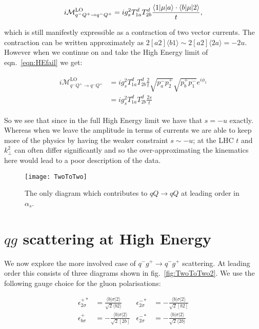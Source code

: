 		\begin{equation}
			i\mathcal{M}_{q^-Q^+\rightarrow q^-Q^+}^{\text{LO}} = ig_s^2T^d_{1a}T^d_{2b}
			\frac{\langle 1 | \mu | a \rangle\cdot\langle b | \mu | 2 \rangle}{t},
			\label{eqn:HEfail}
		\end{equation}

		which is still manifestly expressible as a contraction of two vector currents.  The contraction
		can be written approximately as $2[a2]\langle b1\rangle\sim2[a2]\langle2a\rangle=-2u$.
		However when we continue on and take the High Energy limit of eqn.~\eqref{eqn:HEfail} we get:

		\begin{align}
		\begin{split}
			i\mathcal{M}_{q^-Q^+\rightarrow q^-Q^+}^{\text{LO}} &=
			ig_s^2T^d_{1a}T^d_{2b}\frac{2}{t}\sqrt{p_a^-p_2^+}\sqrt{p_b^+p_1^-}e^{i\phi_1}\\
			&=ig_s^2T^d_{1a}T^d_{2b}\frac{2s}{t}
		\end{split}
		\end{align}

		So we see that since in the full High Energy limit we have that $s=-u$
		exactly.  Whereas when we leave the amplitude in terms of currents we are able to keep
		more of the physics by having the weaker constraint $s\sim-u$; at the LHC $t$ and $k_\perp^2$
		can often differ significantly and so the over-approximating the kinematics here would
		lead to a poor description of the data.

		\begin{figure}
			\begin{center}
			\texttt{[image: TwoToTwo]}
			\caption{The only diagram which contributes to $qQ\rightarrow qQ$ at leading order in $\alpha_s$.}
			\label{fig:TwoToTwo}
			\end{center}
		\end{figure}

	\section{$qg$ scattering at High Energy}

		We now explore the more involved case of $q^-g^+\to q^-g^+$ scattering.  At leading order this
		consists of three diagrams shown in fig.~\eqref{fig:TwoToTwo2}.  We use the following gauge
		choice for the gluon polarisations:

		\begin{align}
		\epsilon^{+*}_{2\sigma}&=\frac{\langle b|\sigma|2\rangle}{\sqrt{2}\langle b2\rangle}
		& \epsilon^{-*}_{2\sigma} &= -\frac{\langle b|\sigma|2\rangle}{\sqrt{2}[b2]} \\
		\epsilon^{+}_{b\sigma}&=-\frac{\langle b|\sigma|2\rangle}{\sqrt{2}[2b]}
		& \epsilon^{-*}_{2\sigma} &= -\frac{\langle b|\sigma|2\rangle}{\sqrt{2}\langle 2b\rangle}
		\end{align}

